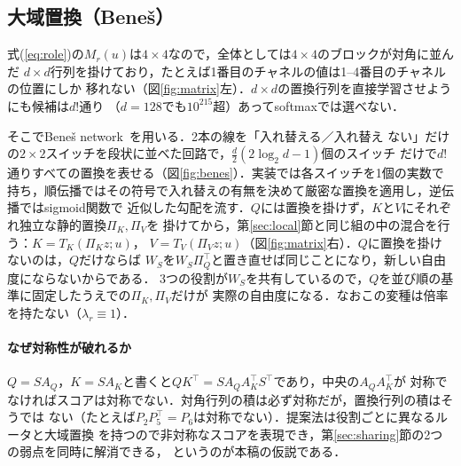 \documentclass{nlp2026}
\begin{document}
\subsection{大域置換（Beneš）}
\label{sec:benes}

式(\ref{eq:role})の$M_r(u)$は$4\times4$なので，全体としては$4\times4$のブロックが対角に並んだ
$d\times d$行列を掛けており，たとえば1番目のチャネルの値は1--4番目のチャネルの位置にしか
移れない（図\ref{fig:matrix}左）．$d\times d$の置換行列を直接学習させようにも候補は$d!$通り
（$d=128$でも$10^{215}$超）あってsoftmaxでは選べない．

そこでBeneš network~\cite{benes1964permutation}を用いる．2本の線を「入れ替える／入れ替え
ない」だけの$2\times2$スイッチを段状に並べた回路で，$\frac{d}{2}(2\log_2 d-1)$個のスイッチ
だけで$d!$通りすべての置換を表せる（図\ref{fig:benes}）．実装では各スイッチを1個の実数で
持ち，順伝播ではその符号で入れ替えの有無を決めて厳密な置換を適用し，逆伝播ではsigmoid関数で
近似した勾配を流す．$Q$には置換を掛けず，$K$と$V$にそれぞれ独立な静的置換$\Pi_K,\Pi_V$を
掛けてから，第\ref{sec:local}節と同じ組の中の混合を行う：$K=T_K(\Pi_K z;u)$，
$V=T_V(\Pi_V z;u)$（図\ref{fig:matrix}右）．$Q$に置換を掛けないのは，$Q$だけならば
$W_S$を$W_S\Pi_Q^\top$と置き直せば同じことになり，新しい自由度にならないからである．
3つの役割が$W_S$を共有しているので，$Q$を並び順の基準に固定したうえでの$\Pi_K,\Pi_V$だけが
実際の自由度になる．なおこの変種は倍率を持たない（$\lambda_r\equiv1$）．

\paragraph{なぜ対称性が破れるか}
$Q=SA_Q$，$K=SA_K$と書くと$QK^\top=SA_QA_K^\top S^\top$であり，中央の$A_QA_K^\top$が
対称でなければスコアは対称でない．対角行列の積は必ず対称だが，置換行列の積はそうでは
ない（たとえば$P_2P_5^\top=P_6$は対称でない）．提案法は役割ごとに異なるルータと大域置換
を持つので非対称なスコアを表現でき，第\ref{sec:sharing}節の2つの弱点を同時に解消できる，
というのが本稿の仮説である．
\end{document}
